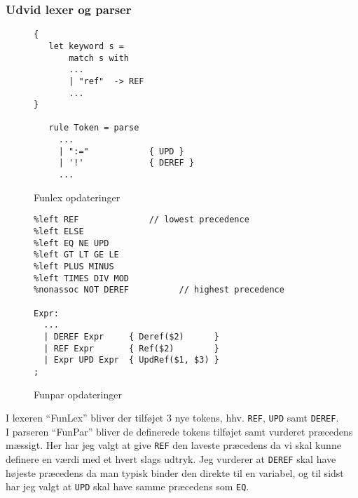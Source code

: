 \subsubsection{Udvid lexer og parser}
\begin{figure}[!ht]
    \centering
\begin{lstlisting}[style=fsharp]
{
   let keyword s =
       match s with
       ...
       | "ref"  -> REF
       ...
}
   
   rule Token = parse
     ...
     | ":="            { UPD }
     | '!'             { DEREF }
     ...
\end{lstlisting}
    \caption{Funlex opdateringer}
    \label{fig:2016:fslex}
\end{figure}
\begin{figure}[!ht]
    \centering
\begin{lstlisting}[style=fsharp]
%token REF UPD DEREF
%left REF              // lowest precedence  
%left ELSE
%left EQ NE UPD
%left GT LT GE LE 
%left PLUS MINUS
%left TIMES DIV MOD 
%nonassoc NOT DEREF          // highest precedence

Expr:
  ...
  | DEREF Expr     { Deref($2)      }
  | REF Expr       { Ref($2)        }
  | Expr UPD Expr  { UpdRef($1, $3) }
;
\end{lstlisting}
    \caption{Funpar opdateringer}
    \label{fig:2016:parser}
\end{figure}
I lexeren ``FunLex'' bliver der tilføjet 3 nye tokens, hhv. \Verb|REF|, \Verb|UPD| samt \Verb|DEREF|.\\
I parseren ``FunPar'' bliver de definerede tokens tilføjet samt vurderet præcedens mæssigt. Her har jeg valgt at give \Verb|REF| den laveste præcedens da vi skal kunne definere en værdi med et hvert slags udtryk. Jeg vurderer at \Verb|DEREF| skal have højeste præcedens da man typisk binder den direkte til en variabel, og til sidst har jeg valgt at \Verb|UPD| skal have samme præcedens som \Verb|EQ|.
